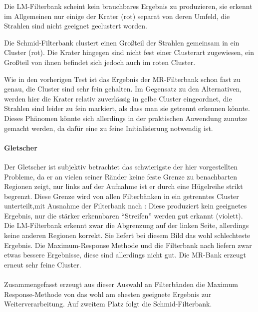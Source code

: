Die LM-Filterbank scheint kein brauchbares Ergebnis zu produzieren, sie erkennt im Allgemeinen nur einige der Krater (rot) separat von deren Umfeld, die Strahlen sind nicht geeignet geclustert worden.

Die Schmid-Filterbank clustert einen Großteil der Strahlen gemeinsam in ein Cluster (rot). Die Krater hingegen sind nicht fest einer Clusterart zugewiesen, ein Großteil von ihnen befindet sich jedoch auch im roten Cluster.

Wie in den vorherigen Test ist das Ergebnis der MR-Filterbank schon fast zu genau, die Cluster sind sehr fein gehalten. Im Gegensatz zu den Alternativen, werden hier die Krater relativ zuverlässig in gelbe Cluster eingeordnet, die Strahlen sind leider zu fein markiert, als dass man sie getrennt erkennen könnte. Dieses Phänomen könnte sich allerdings in der praktischen Anwendung zunutze gemacht werden, da dafür eine zu feine Initialisierung notwendig ist.

\paragraph{Gletscher}

Der Gletscher ist subjektiv betrachtet das schwierigste der hier vorgestellten Probleme, da er an vielen seiner Ränder keine feste Grenze zu benachbarten Regionen zeigt, nur links auf der Aufnahme ist er durch eine Hügelreihe strikt begrenzt. Diese Grenze wird von allen Filterbänken in ein getrenntes Cluster unterteilt,mit Ausnahme der Filterbank nach \cite{jain_91}: Diese produziert kein geeignetes Ergebnis, nur die stärker erkennbaren \enquote{Streifen} werden gut erkannt (violett). Die LM-Filterbank erkennt zwar die Abgrenzung auf der linken Seite, allerdings keine anderen Regionen korrekt. Sie liefert bei diesem Bild das wohl schlechteste Ergebnis. Die Maximum-Response Methode und die Filterbank nach \cite{schmid_01} liefern zwar etwas bessere Ergebnisse, diese sind allerdings nicht gut. Die MR-Bank erzeugt erneut sehr feine Cluster.

\paragraph{}
Zusammengefasst erzeugt aus dieser Auswahl an Filterbänden die Maximum Response-Methode von \cite{visgeo} das wohl am ehesten geeignete Ergebnis zur Weiterverarbeitung. Auf zweitem Platz folgt die Schmid-Filterbank.

